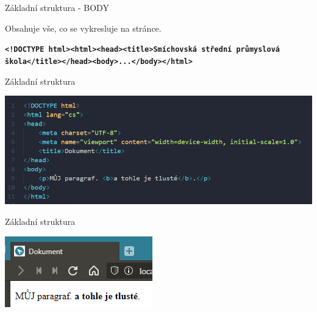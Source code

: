 \documentclass[aspectratio=1610]{beamer}
\begin{document}
\begin{frame}{Základní struktura - BODY}
    \begin{cardTiny}
        \begin{flushleft}
            Obsahuje vše, co se vykresluje na stránce.
        \end{flushleft}
    \end{cardTiny}
    \begin{cardTiny}
        \begin{flushleft}
        \texttt{\textbf{<!DOCTYPE html><html><head><title>Smíchovská střední průmyslová škola</title></head><body>...</body></html>}}
        \end{flushleft}
    \end{cardTiny}
\end{frame}

\begin{frame}{Základní struktura}
    \begin{center}
        \includegraphics[width=\textwidth]{img/html-6.png}
    \end{center}
\end{frame}

\begin{frame}{Základní struktura}
    \begin{center}
        \includegraphics[width=\textwidth]{img/html-6-render.png}
    \end{center}
\end{frame}
\end{document}
